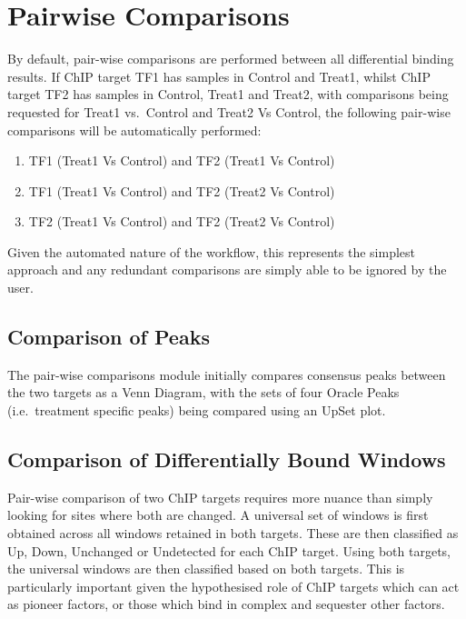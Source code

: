 \documentclass[
]{book}
\providecommand{\tightlist}{%
  \setlength{\itemsep}{0pt}\setlength{\parskip}{0pt}}
\begin{document}
\hypertarget{pairwise-comparisons}{%
\section{Pairwise Comparisons}\label{pairwise-comparisons}}

By default, pair-wise comparisons are performed between all differential binding results.
If ChIP target TF1 has samples in Control and Treat1, whilst ChIP target TF2 has samples in Control, Treat1 and Treat2, with comparisons being requested for Treat1 vs.~Control and Treat2 Vs Control, the following pair-wise comparisons will be automatically performed:

\begin{enumerate}
\def\labelenumi{\arabic{enumi}.}
\tightlist
\item
  TF1 (Treat1 Vs Control) and TF2 (Treat1 Vs Control)
\item
  TF1 (Treat1 Vs Control) and TF2 (Treat2 Vs Control)
\item
  TF2 (Treat1 Vs Control) and TF2 (Treat2 Vs Control)
\end{enumerate}

Given the automated nature of the workflow, this represents the simplest approach and any redundant comparisons are simply able to be ignored by the user.

\hypertarget{comparison-of-peaks}{%
\subsection*{Comparison of Peaks}\label{comparison-of-peaks}}

The pair-wise comparisons module initially compares consensus peaks between the two targets as a Venn Diagram, with the sets of four Oracle Peaks (i.e.~treatment specific peaks) being compared using an UpSet plot.

\hypertarget{comparison-of-differentially-bound-windows}{%
\subsection*{Comparison of Differentially Bound Windows}\label{comparison-of-differentially-bound-windows}}

Pair-wise comparison of two ChIP targets requires more nuance than simply looking for sites where both are changed.
A universal set of windows is first obtained across all windows retained in both targets.
These are then classified as Up, Down, Unchanged or Undetected for each ChIP target.
Using both targets, the universal windows are then classified based on both targets.
This is particularly important given the hypothesised role of ChIP targets which can act as pioneer factors\citep{pioneerfactors}, or those which bind in complex and sequester other factors\citep{hickeynatmed}.
\end{document}
